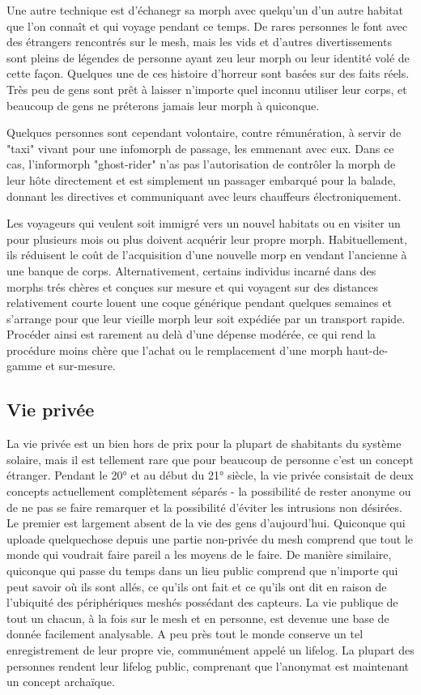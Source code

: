Une autre technique est d'échanegr sa morph avec quelqu'un d'un autre habitat que l'on connaît et qui voyage pendant ce temps. De rares personnes le font avec des étrangers rencontrés sur le mesh, mais les vids et d'autres divertissements sont pleins de légendes de personne ayant zeu leur morph ou leur identité volé de cette façon. Quelques une de ces histoire d'horreur sont basées sur des faits réels. Très peu de gens sont prêt à laisser n'importe quel inconnu utiliser leur corps, et beaucoup de gens ne préterons jamais leur morph à quiconque. 

Quelques personnes sont cependant volontaire, contre rémunération, à servir de "taxi" vivant pour une infomorph de passage, les emmenant avec eux. Dans ce cas, l'informorph "ghost-rider" n'as pas l'autorisation de contrôler la morph de leur hôte directement et est simplement un passager embarqué pour la balade, donnant les directives et communiquant avec leurs chauffeurs électroniquement. 

Les voyageurs qui veulent soit immigré vers un nouvel habitats ou en visiter un pour plusieurs mois ou plus doivent acquérir leur propre morph. Habituellement, ils réduisent le coût de l'acquisition d'une nouvelle morp en vendant l'ancienne à une banque de corps. Alternativement, certains individus incarné dans des morphs trés chères et conçues sur mesure et qui voyagent sur des distances relativement courte louent une coque générique pendant quelques semaines et s'arrange pour que leur vieille morph leur soit expédiée par un transport rapide. Procéder ainsi est rarement au delà d'une dépense modérée, ce qui rend la procédure moins chère que l'achat ou le remplacement d'une morph haut-de-gamme et sur-mesure. 

\subsection{Vie privée} \label{sec:privacy} 

La vie privée est un bien hors de prix pour la plupart de shabitants du système solaire, mais il est tellement rare que pour beaucoup de personne c'est un concept étranger. Pendant le 20° et au début du 21° siècle, la vie privée consistait de deux concepts actuellement complètement séparés - la possibilité de rester anonyme ou de ne pas se faire remarquer et la possibilité d'éviter les intrusions non désirées. Le premier est largement absent de la vie des gens d'aujourd'hui. Quiconque qui uploade quelquechose depuis une partie non-privée du mesh comprend que tout le monde qui voudrait faire pareil a les moyens de le faire. De manière similaire, quiconque qui passe du temps dans un lieu public comprend que n'importe qui peut savoir où ils sont allés, ce qu'ils ont fait et ce qu'ils ont dit en raison de l'ubiquité des périphériques meshés possédant des capteurs. La vie publique de tout un chacun, à la fois sur le mesh et en personne, est devenue une base de donnée facilement analysable. A peu près tout le monde conserve un tel enregistrement de leur propre vie, communément appelé un lifelog. La plupart des personnes rendent leur lifelog public, comprenant que l'anonymat est maintenant un concept archaïque. 

